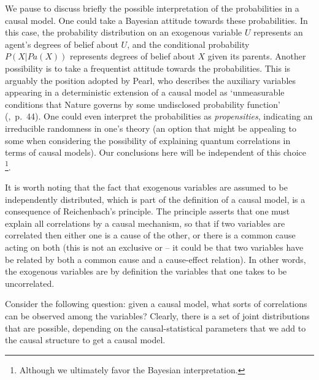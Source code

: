 \documentclass[12pt,onecolumn,nofootinbib]{revtex4-2}
\begin{document}
We pause to discuss briefly the possible interpretation of the probabilities in a causal model.
One could take a Bayesian attitude towards these probabilities.  In this case, the probability distribution on an exogenous variable $U$ represents an agent's degrees of belief about $U$, and the conditional probability $P(X|Pa(X))$ represents degrees of belief about $X$ given its parents.  Another possibility is to take a frequentist attitude towards the probabilities. This is arguably the position adopted by Pearl, who describes the auxiliary variables appearing in a deterministic extension of a causal model as `unmeasurable conditions that Nature governs by some undisclosed probability function' (\cite{Pearl2009},~p.~44).  One could even interpret the probabilities as \emph{propensities}, indicating an irreducible randomness in one's theory (an option that might be appealing to some when considering the possibility of explaining quantum correlations in terms of causal models).  Our conclusions here will be independent of this choice \footnote{Although we ultimately favor the Bayesian interpretation.}.



It is worth noting that the fact that exogenous variables are assumed to be independently distributed, which is part of the definition of a causal model, is a consequence of Reichenbach's principle.
The principle asserts that one must explain
all correlations by a causal mechanism, so that if two variables are correlated then either one is a cause of the other, or there is a common cause acting on both (this is not an exclusive or -- it could be that two variables have be related by both a common cause and a cause-effect relation).
In other words, the exogenous variables are by definition the variables that one takes to be uncorrelated. 

Consider the following question: given a causal model, what sorts of
correlations can be observed among the variables?  Clearly, there is a set of
joint distributions that are possible, depending on the causal-statistical parameters that we
add to the causal structure to get a causal model.
\end{document}
